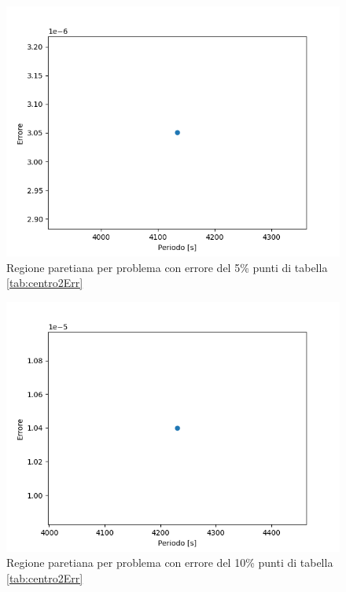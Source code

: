 \documentclass[a4paper,12pt]{report}
\begin{document}
\begin{itemize}
    \begin{figure}[H]
      \centering
      \includegraphics[scale=0.70]{img/puls0125/standard10_err5.png}
      \caption{Regione paretiana per problema con errore del 5\% punti di tabella \ref{tab:centro2Err}}
      \label{fig:reg_ammis_5_0125_std_err}
    \end{figure}

    \begin{figure}[H]
      \centering
      \includegraphics[scale=0.70]{img/puls0125/standard10_err10.png}
      \caption{Regione paretiana per problema con errore del 10\% punti di tabella \ref{tab:centro2Err}}
      \label{fig:reg_ammis_10_0125_std_err}
    \end{figure}


\end{itemize}
\end{document}
